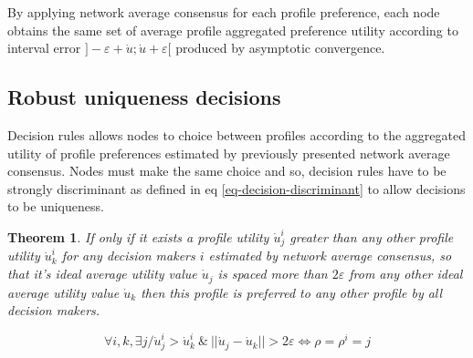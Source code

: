 \documentclass[10pt,twocolumn]{article}
\newtheorem{theorem}{Theorem}
\begin{document}
By applying network average consensus for each profile preference, each node obtains the same set of average profile aggregated preference utility according to interval error $]- \varepsilon + \dot{u} ; \dot{u} + \varepsilon [$ produced by asymptotic convergence.

\subsection{Robust uniqueness decisions}
Decision rules allows nodes to choice between profiles according to the aggregated utility of profile preferences estimated by previously presented network average consensus. Nodes must make the same choice and so, decision rules have to be strongly discriminant as defined in eq \ref{eq-decision-discriminant} to allow decisions to be uniqueness. 

\begin{theorem}
\label{th-preference}
If only if it exists a profile utility $\dot{u}_j^i$ greater than any other profile utility $\dot{u}_k^i$ for any decision makers $i$ estimated by network average consensus, so that it's ideal average utility value $\dot{u}_j$ is spaced more than $2 \varepsilon$ from any other ideal average utility value $\dot{u}_k $ then this profile is preferred to any other profile by all decision makers. 
 
\begin{equation}
\label{eq-decision-discriminant}
\forall i, k, \exists j / \dot{u}_j^i > \dot{u}_k^i \ \& \ || \dot{u}_j - \dot{u}_k|| > 2 \varepsilon \Longleftrightarrow \rho = \rho^i = j
\end{equation}

\end{theorem}
\end{document}
